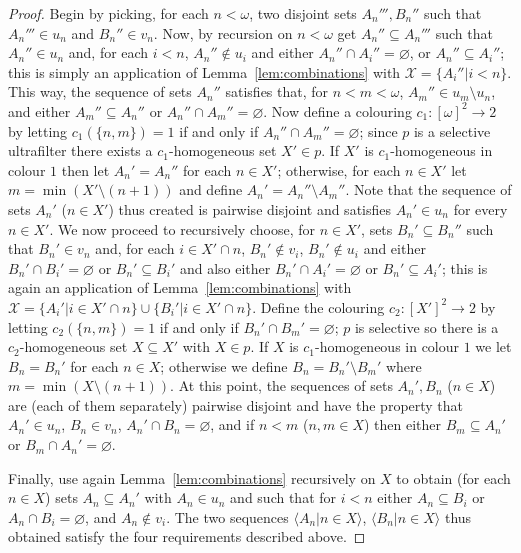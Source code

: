 \documentclass[10pt]{amsart}
\theoremstyle{definition}
\theoremstyle{remark}
\begin{document}
\begin{proof}
Begin by picking, for each $n<\omega$, two disjoint sets $A_n''',B_n''$ such that $A_n'''\in u_n$ and $B_n''\in v_n$. Now, by recursion on $n<\omega$ get $A_n''\subseteq A_n'''$ such that $A_n''\in u_n$ and, for each $i<n$, $A_n''\notin u_i$ and either $A_n''\cap A_i''=\varnothing$, or $A_n''\subseteq A_i''$; this is simply an application of Lemma~\ref{lem:combinations} with $\mathscr X=\{A_i''\big|i<n\}$. This way, the sequence of sets $A_n''$ satisfies that, for $n<m<\omega$, $A_m''\in u_m\setminus u_n$, and either $A_m''\subseteq A_n''$ or $A_n''\cap A_m''=\varnothing$. Now define a colouring $c_1:[\omega]^2\longrightarrow 2$ by letting $c_1(\{n,m\})=1$ if and only if $A_n''\cap A_m''=\varnothing$; since $p$ is a selective ultrafilter there exists a $c_1$-homogeneous set $X'\in p$. If $X'$ is $c_1$-homogeneous in colour $1$ then let $A_n'=A_n''$ for each $n\in X'$; otherwise, for each $n\in X'$ let $m=\min(X'\setminus(n+1))$ and define $A_n'=A_n''\setminus A_m''$. Note that the sequence of sets $A_n'$ ($n\in X'$) thus created is pairwise disjoint and satisfies $A_n'\in u_n$ for every $n\in X'$. We now proceed to recursively choose, for $n\in X'$, sets $B_n'\subseteq B_n''$ such that $B_n'\in v_n$ and, for each $i\in X'\cap n$, $B_n'\notin v_i$, $B_n'\notin u_i$ and either $B_n'\cap B_i'=\varnothing$ or $B_n'\subseteq B_i'$ and also either $B_n'\cap A_i'=\varnothing$ or $B_n'\subseteq A_i'$; this is again an application of Lemma~\ref{lem:combinations} with $\mathscr X=\{A_i'\big|i\in X'\cap n\}\cup\{B_i'\big|i\in X'\cap n\}$. Define the colouring $c_2:[X']^2\longrightarrow 2$ by letting $c_2(\{n,m\})=1$ if and only if $B_n'\cap B_m'=\varnothing$; $p$ is selective so there is a $c_2$-homogeneous set $X\subseteq X'$ with $X\in p$. If $X$ is $c_1$-homogeneous in colour $1$ we let $B_n=B_n'$ for each $n\in X$; otherwise we define $B_n=B_n'\setminus B_m'$ where $m=\min(X\setminus(n+1))$. At this point, the sequences of sets $A_n',B_n$ ($n\in X$) are (each of them separately) pairwise disjoint and have the property that $A_n'\in u_n$, $B_n\in v_n$, $A_n'\cap B_n=\varnothing$, and if $n<m$ ($n,m\in X$) then either $B_m\subseteq A_n'$ or $B_m\cap A_n'=\varnothing$.

Finally, use again Lemma~\ref{lem:combinations} recursively on $X$ to obtain (for each $n\in X$) sets $A_n\subseteq A_n'$ with $A_n\in u_n$ and such that for $i<n$ either $A_n\subseteq B_i$ or $A_n\cap B_i=\varnothing$, and $A_n\not\in v_i$. The two sequences $\langle A_n\big|n\in X\rangle$, $\langle B_n\big|n\in X\rangle$ thus obtained satisfy the four requirements described above.


\end{proof}
\end{document}
